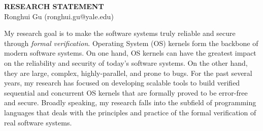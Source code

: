 \documentclass[a4paper, 10pt]{article}
\begin{document}
\thispagestyle{fancy}
\lhead{}
\rhead{}
\renewcommand{\headrulewidth}{0pt} 
\renewcommand{\footrulewidth}{0pt} 
\fancyfoot[C]{\footnotesize \textcolor{gray}{http://www.guronghui.com}} 


\pagestyle{fancy}
\lhead{\textcolor{gray}{\it Ronghui Gu}}
\rhead{\textcolor{gray}{\thepage/\totalpages{}}}

\begin{small}

\begin{center}
{\LARGE \bf RESEARCH STATEMENT}\\
\vspace*{0.2cm}
{\normalsize Ronghui Gu (ronghui.gu@yale.edu)}
\end{center}



My research goal is to make the software systems truly reliable and secure through \emph{formal verification}.
Operating System (OS) kernels form the backbone of
modern software systems. On one hand, OS kernels can have the greatest impact on the reliability and security of today's software systems.
On the other hand, they are large, complex, highly-parallel, and prone to bugs. For the past several years,  my research has focused on developing scalable tools to build verified sequential and concurrent OS kernels that are formally proved to be error-free and secure.
Broadly speaking, my research
falls into the subfield of programming languages that deals with the 
principles and practice of the formal verification
of real software systems.




\end{small}
\end{document}

